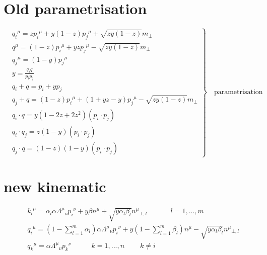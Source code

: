 \section{Old parametrisation}

	
\begin{equation}
	\left.\begin{aligned}
	&{q_i}^{\mu} = z{p_i}^{\mu} + y(1-z){p_j}^{\mu} + \sqrt{zy(1-z)}{m}_{\bot} \\
	&{q}^{\mu}   = (1-z){p_i}^{\mu} + yz {p_j}^{\mu} - \sqrt{zy(1-z)}{m}_{\bot} \\
	&{q_j}^{\mu} = (1-y) {p_j}^{\mu} \\
		&y       = \frac{q_i q}{p_i p_j} \\
&q_i +q      = p_i + yp_j \\
&q_j +q      = (1-z){p_i}^{\mu} + (1+yz-y) {p_j}^{\mu} - \sqrt{zy(1-z)}{m}_{\bot}\\
&q_i \cdot q = y(1-2z+2z^2)(p_i \cdot p_j)\\
&q_i \cdot q_j = z(1-y) (p_i \cdot p_j)\\
&q_j \cdot q = (1-z)(1-y) (p_i \cdot p_j)
		\end{aligned}
	\right\}
	\quad \text{parametrisation}
\end{equation}


\section{new kinematic}
\begin{equation}
	\begin{aligned}
	&{k_l}^{\mu} = \alpha_l \alpha {\Lambda^{\mu}}_{\nu}{p_i}^{\nu} + y\beta{n}^{\mu} + \sqrt{y\alpha_l\beta_l}{n^{\mu}}_{\bot,l} \:\:\:\:\:\:\:\:\:\:\:\:\:\:\:{l=1,...,m} \\
	&{q_i}^{\mu}   = (1-\displaystyle\sum\limits_{l=1}^m \alpha_l) \alpha {\Lambda^{\mu}}_{\nu}{p_i}^{\nu} + y(1-\displaystyle\sum\limits_{l=1}^m \beta_l){n}^{\mu} - \sqrt{y\alpha_l\beta_l}{n^{\mu}}_{\bot,l} \\
	&{q_k}^{\mu} = \alpha {\Lambda^{\mu}}_{\nu}{p_k}^{\nu} \:\:\:\:\:\:\:\:\:\:\:\:\: {k=1,...,n}\:\:\:\:\:\:\:\:\:\:k\neq i\\
    \end{aligned}
\end{equation}

